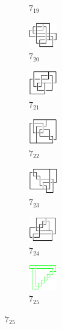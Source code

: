 \documentclass{article}
\theoremstyle{definition}
\theoremstyle{theorem}
\theoremstyle{proposition}
\theoremstyle{corollary}
\begin{document}
\begin{figure}[H]
\begin{subfigure}{0.075\textwidth}
    \caption{$7_{19}$} 
    \end{subfigure}
    \begin{subfigure}{0.075\textwidth}
    \includegraphics[width=1.25cm]{../Midterm_Poster/grid_diagram/theta_7_20.png}
    \caption{$7_{20}$} 
    \end{subfigure}
    \begin{subfigure}{0.075\textwidth}
    \includegraphics[width=1.25cm]{../Midterm_Poster/grid_diagram/theta_7_21.png}
    \caption{$7_{21}$} 
    \end{subfigure}
    \begin{subfigure}{0.075\textwidth}
    \includegraphics[width=1.25cm]{../Midterm_Poster/grid_diagram/theta_7_22.png}
    \caption{$7_{22}$} 
    \end{subfigure}
    \begin{subfigure}{0.075\textwidth}
    \includegraphics[width=1.25cm]{../Midterm_Poster/grid_diagram/theta_7_23.png}
    \caption{$7_{23}$} 
    \end{subfigure}
    \begin{subfigure}{0.075\textwidth}
    \includegraphics[width=1.25cm]{../Midterm_Poster/grid_diagram/theta_7_24.png}
    \caption{$7_{24}$} 
    \end{subfigure}
    \begin{subfigure}{0.075\textwidth}
    \includegraphics[width=1.25cm]{../Midterm_Poster/grid_diagram/theta_7_25.png}
    \caption{$7_{25}$} 
    \end{subfigure}

\end{figure}
\end{document}
